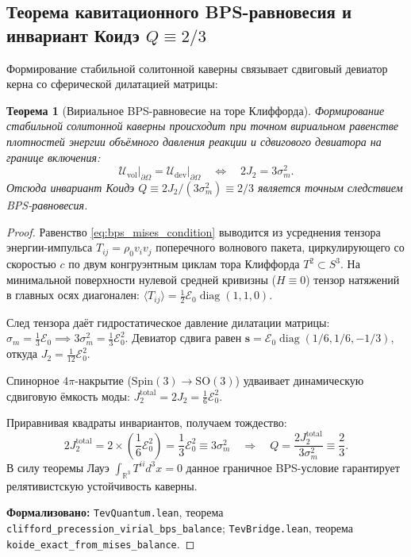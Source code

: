 \documentclass[11pt,a4paper]{article}
\newtheorem{theorem}{Теорема}
\theoremstyle{definition}
\theoremstyle{remark}
\begin{document}
\subsection{Теорема кавитационного BPS-равновесия и инвариант Коидэ $Q \equiv 2/3$}

Формирование стабильной солитонной каверны связывает сдвиговый девиатор керна со сферической дилатацией матрицы:

\begin{theorem}[Вириальное BPS-равновесие на торе Клиффорда]
\label{thm:bps_cavitation}
Формирование стабильной солитонной каверны происходит при точном вириальном равенстве плотностей энергии объёмного давления реакции и сдвигового девиатора на границе включения:
\begin{equation}
    \mathcal{U}_{\mathrm{vol}} \big|_{\partial\Omega} = \mathcal{U}_{\mathrm{dev}} \big|_{\partial\Omega} \quad \Longleftrightarrow \quad 2 J_2 = 3 \sigma_m^2.
    \label{eq:bps_mises_condition}
\end{equation}
Отсюда инвариант Коидэ $Q \equiv 2J_2 / (3\sigma_m^2) \equiv 2/3$ является точным следствием BPS-равновесия.
\end{theorem}
\begin{proof}
Равенство \eqref{eq:bps_mises_condition} выводится из усреднения тензора энергии-импульса $T_{ij} = \rho_0 v_i v_j$ поперечного волнового пакета, циркулирующего со скоростью $c$ по двум конгруэнтным циклам тора Клиффорда $T^2 \subset S^3$. На минимальной поверхности нулевой средней кривизны ($H \equiv 0$) тензор натяжений в главных осях диагонален: $\langle T_{ij} \rangle = \frac{1}{2}\mathcal{E}_0 \operatorname{diag}(1, 1, 0)$.

След тензора даёт гидростатическое давление дилатации матрицы: $\sigma_m = \frac{1}{3}\mathcal{E}_0 \implies 3\sigma_m^2 = \frac{1}{3}\mathcal{E}_0^2$. Девиатор сдвига равен $\mathbf{s} = \mathcal{E}_0 \operatorname{diag}(1/6, 1/6, -1/3)$, откуда $J_2 = \frac{1}{12}\mathcal{E}_0^2$. 

Спинорное $4\pi$-накрытие ($\mathrm{Spin}(3) \to \mathrm{SO}(3)$) удваивает динамическую сдвиговую ёмкость моды: $J_2^{\mathrm{total}} = 2 J_2 = \frac{1}{6}\mathcal{E}_0^2$. 

Приравнивая квадраты инвариантов, получаем тождество:
\begin{equation}
2 J_2^{\mathrm{total}} = 2 \times \left(\frac{1}{6}\mathcal{E}_0^2\right) = \frac{1}{3}\mathcal{E}_0^2 \equiv 3\sigma_m^2 \quad \Longrightarrow \quad Q = \frac{2 J_2^{\mathrm{total}}}{3\sigma_m^2} \equiv \frac{2}{3}.
\end{equation}
В силу теоремы Лауэ $\int_{\mathbb{R}^3} T^{ii} d^3x = 0$ данное граничное BPS-условие гарантирует релятивистскую устойчивость каверны.

\noindent\small\textbf{Формализовано:} \texttt{TevQuantum.lean}, теорема \texttt{clifford_precession_virial_bps_balance}; \texttt{TevBridge.lean}, теорема \texttt{koide_exact_from_mises_balance}.
\end{proof}
\end{document}
